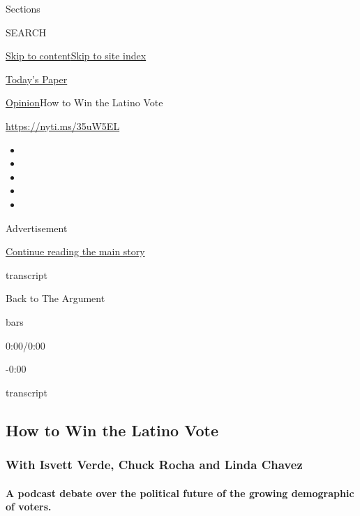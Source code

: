 Sections

SEARCH

\protect\hyperlink{site-content}{Skip to
content}\protect\hyperlink{site-index}{Skip to site index}

\href{https://myaccount.nytimes3xbfgragh.onion/auth/login?response_type=cookie\&client_id=vi}{}

\href{https://www.nytimes3xbfgragh.onion/section/todayspaper}{Today's
Paper}

\href{/section/opinion}{Opinion}\textbar{}How to Win the Latino Vote

\url{https://nyti.ms/35uW5EL}

\begin{itemize}
\item
\item
\item
\item
\item
\end{itemize}

Advertisement

\protect\hyperlink{after-top}{Continue reading the main story}

transcript

Back to The Argument

bars

0:00/0:00

-0:00

transcript

\hypertarget{how-to-win-the-latino-vote}{%
\subsection{How to Win the Latino
Vote}\label{how-to-win-the-latino-vote}}

\hypertarget{with-isvett-verde-chuck-rocha-and-linda-chavez}{%
\subsubsection{With Isvett Verde, Chuck Rocha and Linda
Chavez}\label{with-isvett-verde-chuck-rocha-and-linda-chavez}}

\hypertarget{a-podcast-debate-over-the-political-future-of-the-growing-demographic-of-voters}{%
\paragraph{A podcast debate over the political future of the growing
demographic of
voters.}\label{a-podcast-debate-over-the-political-future-of-the-growing-demographic-of-voters}}

